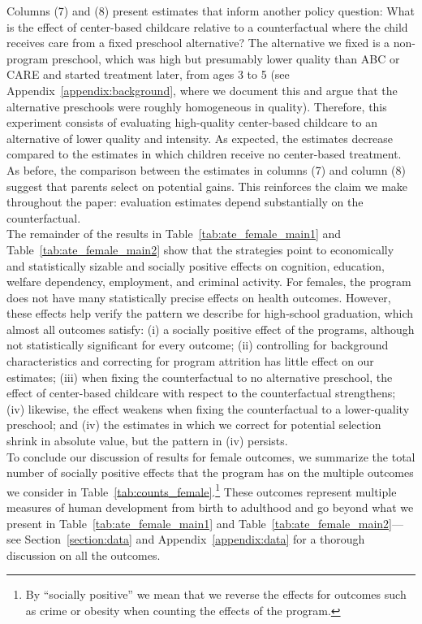 \noindent Columns (7) and (8) present estimates that inform another policy question: What is the effect of center-based childcare relative to a counterfactual where the child receives care from a fixed preschool alternative? The alternative we fixed is a non-program preschool, which was high but  presumably lower quality than ABC or CARE and started treatment later, from ages 3 to 5 (see Appendix~\ref{appendix:background}, where we document this and argue that the alternative preschools were roughly homogeneous in quality). Therefore, this experiment consists of evaluating high-quality center-based childcare to an alternative of lower quality and intensity. As expected, the estimates decrease compared to the estimates in which children receive no center-based treatment. As before, the comparison between the estimates in columns (7) and column (8) suggest that parents select on potential gains. This reinforces the claim we make throughout the paper: evaluation estimates depend substantially on the counterfactual.\\

\noindent The remainder of the results in Table~\ref{tab:ate_female_main1} and Table~\ref{tab:ate_female_main2} show that the strategies point to economically and statistically sizable and socially positive effects on cognition, education, welfare dependency, employment, and criminal activity. For females, the program does not have many statistically precise effects on health outcomes. However, these effects help verify the pattern we describe for high-school graduation, which almost all outcomes satisfy: (i) a socially positive effect of the programs, although not statistically significant for every outcome; (ii) controlling for background characteristics and correcting for program attrition has little effect on our estimates; (iii) when fixing the counterfactual to no alternative preschool, the effect of center-based childcare with respect to the counterfactual strengthens; (iv) likewise, the effect weakens when fixing the counterfactual to a lower-quality preschool; and (iv) the estimates in which we correct for potential selection shrink in absolute value, but the pattern in (iv) persists.\\

\noindent To conclude our discussion of results for female outcomes, we summarize the total number of socially positive effects that the program has on the multiple outcomes we consider in Table~\ref{tab:counts_female}.\footnote{By ``socially positive'' we mean that we reverse the effects for outcomes such as crime or obesity when counting the effects of the program.} These outcomes represent multiple measures of human development from birth to adulthood and go beyond what we present in Table~\ref{tab:ate_female_main1} and Table~\ref{tab:ate_female_main2}---see Section~\ref{section:data} and Appendix~\ref{appendix:data} for a thorough discussion on all the outcomes.\\ 

